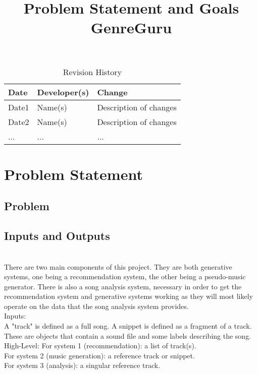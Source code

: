 \documentclass{article}
\title{Problem Statement and Goals\\ GenreGuru}
\author{\authname}
\date{}
\begin{document}
\maketitle

\begin{table}[hp]
\caption{Revision History} \label{TblRevisionHistory}
\begin{tabularx}{\textwidth}{llX}
\toprule
\textbf{Date} & \textbf{Developer(s)} & \textbf{Change}\\
\midrule
Date1 & Name(s) & Description of changes\\
Date2 & Name(s) & Description of changes\\
... & ... & ...\\
\bottomrule
\end{tabularx}
\end{table}

\section{Problem Statement}



\subsection{Problem}

\subsection{Inputs and Outputs}

\\

There are two main components of this project. They are both generative systems, one being a recommendation
system, the other being a pseudo-music generator. There is also a song analysis system, necessary in
order to get the recommendation system and generative systems working as they will most likely operate on 
the data that the song analysis system provides. \\

Inputs:\\
A "track" is defined as a full song. A snippet is defined as a fragment of a track. These are objects that 
contain a sound file and some labels describing the song. 
High-Level: 
For system 1 (recommendation): a list of track(s). \\
For system 2 (music generation): a reference track or snippet. \\
For system 3 (analysis): a singular reference track. \\
\end{document}
